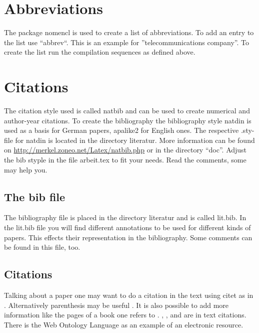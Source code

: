 \section{Abbreviations}
\label{sec:abbreviations}

The package nomencl is used to create a list of abbreviations. To add an entry to the list use ``abbrev``. This is an example for ''telecommunications company''. To create the list run the compilation sequences as defined above.


\section{Citations}
\label{sec:citations}

The citation style used is called natbib and can be used to create numerical and author-year citations. To create the bibliography the bibliography style natdin is used as a basis for German papers, apalike2 for English ones. The respective .sty-file for natdin is located in the directory literatur. More information can be found on \url{http://merkel.zoneo.net/Latex/natbib.php} or in the directory ``doc''. Adjust the bib styple in the file arbeit.tex to fit your needs. Read the comments, some may help you. 

\subsection{The bib file}
\label{subsec:theBibFile}

The bibliography file is placed in the directory literatur and is called lit.bib. In the lit.bib file you will find different annotations to be used for different kinds of papers. This effects their representation in the bibliography. Some comments can be found in this file, too.

\subsection{Citations}
\label{subsec:citations}

Talking about a paper one may want to do a citation in the text using citet as in \citet{COMITY}. Alternatively parenthesis may be useful \citep{tannenbaum}. It is also possible to add more information like the pages of a book one refers to \citep[pp. 222-333]{tannenbaum}. \citet{ECORA}, \citet{random}, \citet{habil} and \citet{master} are in text citations. There is the Web Ontology Language  \citep{OWL} as an example of an electronic resource.

